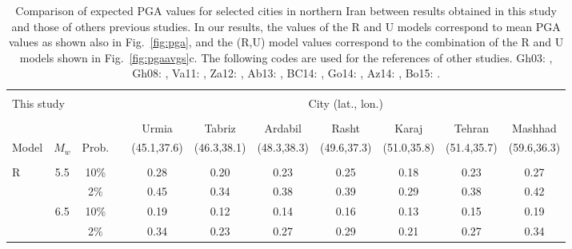 \setlength{\tabcolsep}{1ex}

\begin{table*}[t]
\centering
\caption{Comparison of expected PGA values for selected cities in northern Iran between results obtained in this study and those of others previous studies. In our results, the values of the R and U models correspond to mean PGA values as shown also in Fig.~\ref{fig:pga}, and the (R,U) model values correspond to the combination of the R and U models shown in Fig.~\ref{fig:pgaavgs}c. The following codes are used for the references of other studies.
    Gh03: \citet{Ghodrati2003},
    Gh08: \citet{Ghodrati2008},
    Va11: \citet{Vafaie2011},
    Za12: \citet{Zare2012},
    Ab13: \citet{Abdi2013},
    BC14: \citet{BHRC2014},
    Go14: \citet{Golara2014},
    Az14: \citet{Abdollahzadeh2014a},
    Bo15: \citet{Boostan2015}.
    }
\begin{tabular}{lcccccccccc}
    \hline                                                                                                                      \\[-1.6ex]
    \multicolumn{2}{l}{This study}  
                    &        && \multicolumn{7}{c}{City (lat., lon.)}                                                           \\[0.6ex]
    \cline{5-11}                                                                                                                \\[-1.6ex]
            &       &        &&   Urmia     &   Tabriz    &   Ardabil   &   Rasht     &   Karaj     &   Tehran    &   Mashhad   \\
    Model   & $M_w$ & Prob.  && (45.1,37.6) & (46.3,38.1) & (48.3,38.3) & (49.6,37.3) & (51.0,35.8) & (51.4,35.7) & (59.6,36.3) \\[0.6ex]
    \cline{1-3} \cline{5-11}                                                                                                    \\[-1.6ex]
    R       &   5.5 &  10\%  &&   0.28      &   0.20      &   0.23      &   0.25      &   0.18      &   0.23      &   0.27      \\
            &       &   2\%  &&   0.45      &   0.34      &   0.38      &   0.39      &   0.29      &   0.38      &   0.42      \\
            &   6.5 &  10\%  &&   0.19      &   0.12      &   0.14      &   0.16      &   0.13      &   0.15      &   0.19      \\
            &       &   2\%  &&   0.34      &   0.23      &   0.27      &   0.29      &   0.21      &   0.27      &   0.34      \\

\end{tabular}
\end{table*}
